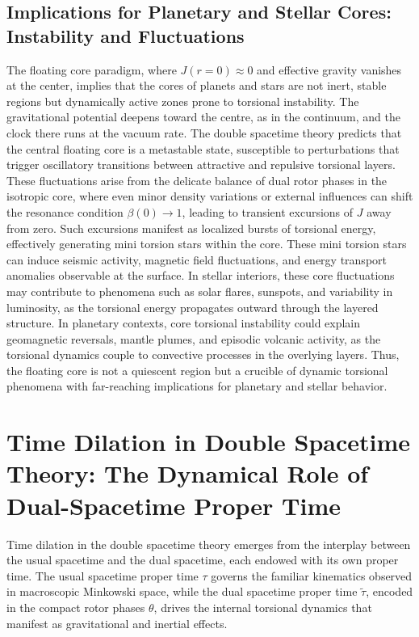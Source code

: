 \documentclass[a4paper]{article}
\begin{document}
\subsection{Implications for Planetary and Stellar Cores: Instability and Fluctuations}

The floating core paradigm, where $J(r=0) \approx 0$ and effective gravity vanishes at the center, implies that the cores of planets and stars are not inert, stable regions but dynamically active zones prone to torsional instability. The gravitational potential deepens toward the centre, as in the continuum, and the clock there runs at the vacuum rate. The double spacetime theory predicts that the central floating core is a metastable state, susceptible to perturbations that trigger oscillatory transitions between attractive and repulsive torsional layers. These fluctuations arise from the delicate balance of dual rotor phases in the isotropic core, where even minor density variations or external influences can shift the resonance condition $\beta(0) \to 1$, leading to transient excursions of $J$ away from zero. Such excursions manifest as localized bursts of torsional energy, effectively generating mini torsion stars within the core. These mini torsion stars can induce seismic activity, magnetic field fluctuations, and energy transport anomalies observable at the surface. In stellar interiors, these core fluctuations may contribute to phenomena such as solar flares, sunspots, and variability in luminosity, as the torsional energy propagates outward through the layered structure. In planetary contexts, core torsional instability could explain geomagnetic reversals, mantle plumes, and episodic volcanic activity, as the torsional dynamics couple to convective processes in the overlying layers. Thus, the floating core is not a quiescent region but a crucible of dynamic torsional phenomena with far-reaching implications for planetary and stellar behavior.

\section{Time Dilation in Double Spacetime Theory: The Dynamical Role of Dual-Spacetime Proper Time}
\label{sec:timedilation}

Time dilation in the double spacetime theory emerges from the interplay between the usual spacetime and the dual spacetime, each endowed with its own proper time. The usual spacetime proper time $\tau$ governs the familiar kinematics observed in macroscopic Minkowski space, while the dual spacetime proper time $\tilde{\tau}$, encoded in the compact rotor phases $\theta$, drives the internal torsional dynamics that manifest as gravitational and inertial effects.
\end{document}
